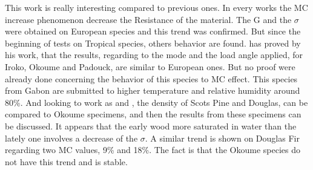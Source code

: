 \documentclass[3p,times,procedia]{elsarticle}
\begin{document}
This work is really interesting compared to previous ones. In every works the MC increase phenomenon decrease the Resistance of the material. The G and the $\sigma$ were obtained on European species and this trend was confirmed. But since the beginning of tests on Tropical species, others behavior are found. \cite{Reference7} has proved by his work, that the results, regarding to the mode and the load angle applied, for Iroko, Okoume and Padouck, are similar to European ones. But no proof were already done concerning the behavior of this species to MC effect. This species from Gabon are submitted to higher temperature and relative humidity around 80\%. And looking to work as \cite{Kif1998} and \cite{Ang2017}, the density of Scots Pine and Douglas, can be compared to Okoume specimens, and then the results from these specimens can be discussed. It appears that the early wood more saturated in water than the lately one involves a decrease of the $\sigma$. A similar trend is shown on Douglas Fir regarding two MC values, 9\% and 18\%. The fact is that the Okoume species do not have this trend and is stable.




\end{document}
